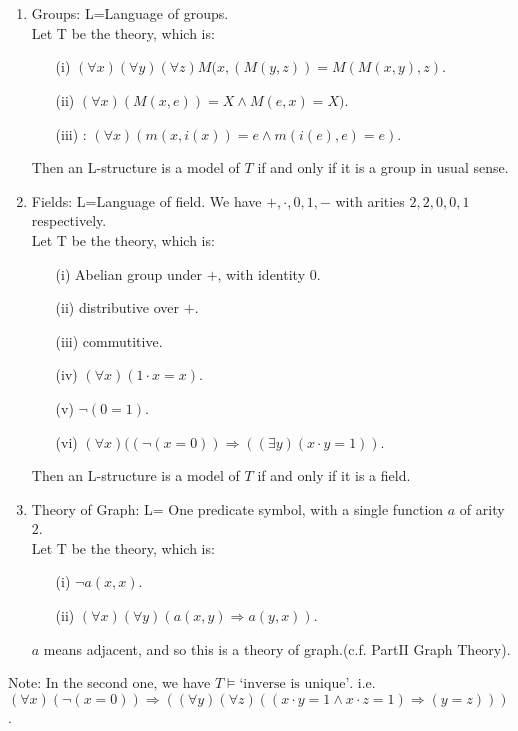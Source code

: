 ~\\
\begin{example}
~\\
\begin{enumerate}
\item Groups: L=Language of groups.\\
Let T be the theory, which is:\\
\begin{enumerate}
\item[(i)] $(\forall x)(\forall y)(\forall z) M(x,(M(y,z))=M(M(x,y),z)$.\\
\item[(ii)] $(\forall x)(M(x,e))=X \wedge M(e,x)=X)$.\\
\item[(iii)]: $(\forall x)(m(x,i(x))=e \wedge m(i(e),e)=e)$.
\end{enumerate}
Then an L-structure is a model of $T$ if and only if it is a group in usual sense.\\
\item Fields: L=Language of field. We have $+,\cdot,0,1,-$ with arities $2,2,0,0,1$ respectively.\\
Let T be the theory, which is:\\
\begin{enumerate}
\item[(i)] Abelian group under $+$, with identity $0$.\\
\item[(ii)] distributive over $+$.\\
\item[(iii)] commutitive.\\
\item[(iv)] $(\forall x)(1 \cdot x =x)$.\\
\item[(v)] $\neg (0=1)$.
\item[(vi)] $(\forall x)((\neg(x=0)) \Rightarrow ((\exists y)(x \cdot y = 1))$.
\end{enumerate}
Then an L-structure is a model of $T$ if and only if it is a field.
\item Theory of Graph: L= One predicate symbol, with a single function $a$ of arity $2$.\\
Let T be the theory, which is:\\
\begin{enumerate}
\item[(i)] $\neg a(x,x)$.\\
\item[(ii)] $(\forall x)(\forall y)(a(x,y) \Rightarrow a(y,x))$.
\end{enumerate}
$a$ means adjacent, and so this is a theory of graph.(c.f. PartII Graph Theory).
\end{enumerate}
\end{example}
Note: In the second one, we have $T \models \text{`inverse is unique'}$. i.e.\\
$(\forall x)(\neg (x=0)) \Rightarrow ((\forall y)(\forall z)((x \cdot y =1 \wedge x \cdot z =1) \Rightarrow (y=z)))$.
